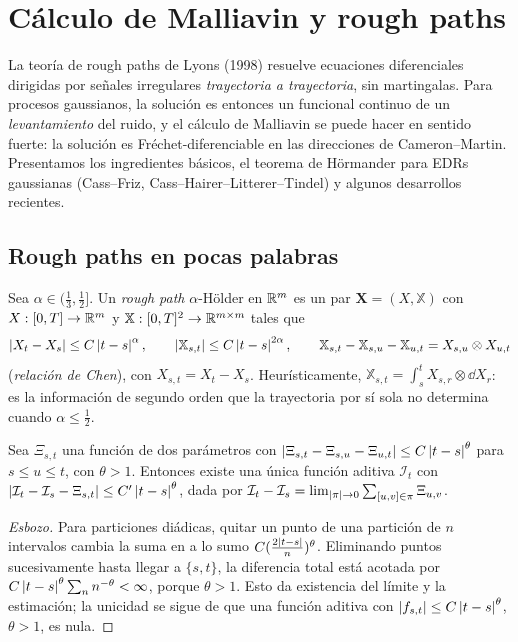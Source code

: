 \chapter{Cálculo de Malliavin y rough paths}\label{cap:rough-paths}

\begin{panorama}
La teoría de rough paths de Lyons (1998) resuelve ecuaciones diferenciales dirigidas por
señales irregulares \emph{trayectoria a trayectoria}, sin martingalas. Para procesos gaussianos, la
solución es entonces un funcional continuo de un \emph{levantamiento} del ruido, y el cálculo
de Malliavin se puede hacer en sentido fuerte: la solución es Fréchet-diferenciable en las
direcciones de Cameron--Martin. Presentamos los ingredientes básicos, el teorema de
Hörmander para EDRs gaussianas (Cass--Friz, Cass--Hairer--Litterer--Tindel) y algunos
desarrollos recientes.
\end{panorama}

\section{Rough paths en pocas palabras}
Sea $\alpha\in(\frac13,\frac12]$. Un \emph{rough path} $\alpha$-Hölder en $\mathbb{R}^m$ es un par $\mathbf X=(X,\mathbb X)$ con $X:[0,T]\to\mathbb{R}^m$ y
$\mathbb X:[0,T]^2\to\mathbb{R}^{m\times m}$ tales que
\[
  \left\lvert X_t-X_s\right\rvert\le C\left\lvert t-s\right\rvert^\alpha,\qquad\left\lvert \mathbb X_{s,t}\right\rvert\le C\left\lvert t-s\right\rvert^{2\alpha},\qquad\mathbb X_{s,t}-\mathbb X_{s,u}-\mathbb X_{u,t}=X_{s,u}\otimes X_{u,t}
\]
(\emph{relación de Chen}), con $X_{s,t}=X_t-X_s$. Heurísticamente, $\mathbb X_{s,t}=\int_s^tX_{s,r}\otimes\dd X_r$: es la información
de segundo orden que la trayectoria por sí sola no determina cuando $\alpha\le\frac12$.

\begin{lema}\label{lem:sewing}
Sea $\Xi_{s,t}$ una función de dos parámetros con
$\left\lvert \Xi_{s,t}-\Xi_{s,u}-\Xi_{u,t}\right\rvert\le C\left\lvert t-s\right\rvert^\theta$ para $s\le u\le t$, con $\theta>1$. Entonces existe una única función
aditiva $\mathcal I_t$ con $\left\lvert \mathcal I_t-\mathcal I_s-\Xi_{s,t}\right\rvert\le C'\left\lvert t-s\right\rvert^\theta$, dada por $\mathcal I_t-\mathcal I_s=\lim_{\left\lvert \pi\right\rvert\to0}\sum_{[u,v]\in\pi}\Xi_{u,v}$.
\end{lema}

\begin{proof}[Esbozo]
Para particiones diádicas, quitar un punto de una partición de $n$ intervalos cambia
la suma en a lo sumo $C(\frac{2\left\lvert t-s\right\rvert}{n})^\theta$. Eliminando puntos sucesivamente hasta llegar a $\{s,t\}$, la
diferencia total está acotada por $C\left\lvert t-s\right\rvert^\theta\sum_nn^{-\theta}<\infty$, porque $\theta>1$. Esto da existencia del
límite y la estimación; la unicidad se sigue de que una función aditiva con $\left\lvert f_{s,t}\right\rvert\le C\left\lvert t-s\right\rvert^\theta$,
$\theta>1$, es nula.
\end{proof}

